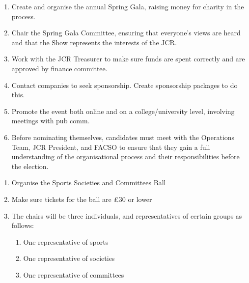 \begin{enumerate}
    \item Create and organise the annual Spring Gala, raising money for charity in the process.
    \item Chair the Spring Gala Committee, ensuring that everyone’s views are heard and that the Show represents the interests of the JCR.
    \item Work with the JCR Treasurer to make sure funds are spent correctly and are approved by finance committee.
    \item Contact companies to seek sponsorship. Create sponsorship packages to do this. 
    \item Promote the event both online and on a college/university level, involving meetings with pub comm.
    \item Before nominating themselves, candidates must meet with the Operations Team, JCR President, and FACSO to ensure that they gain a full understanding of the organisational process and their responsibilities before the election.
    
\end{enumerate}

\begin{enumerate}
    \item Organise the Sports Societies and Committees Ball
    \item Make sure tickets for the ball are £30 or lower
    \item The chairs will be three individuals, and representatives of certain groups as follows:
    \begin{enumerate}
        \item One representative of sports
        \item One representative of societies 
        \item One representative of committees 
    \end{enumerate}
\end{enumerate}

